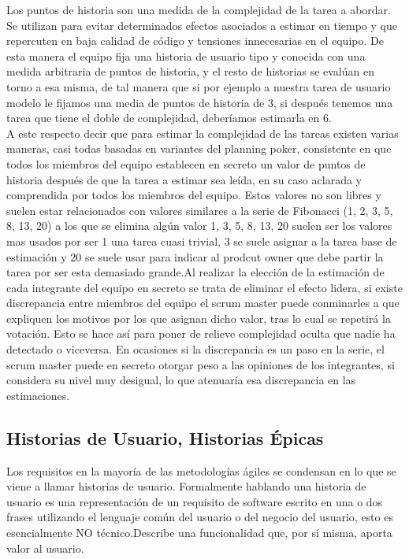 \documentclass[../pfc.tex]{subfiles}
\begin{document}
	Los puntos de historia son una medida de la complejidad de la tarea a abordar. Se utilizan para evitar determinados efectos asociados a estimar en tiempo y que repercuten en baja calidad de código y tensiones innecesarias en el equipo. De esta manera el equipo fija una historia de usuario tipo y conocida con una medida arbitraria de puntos de historia, y el resto de historias se evalúan en torno a esa misma, de tal manera que si por ejemplo a nuestra tarea de usuario modelo le fijamos una media de puntos de historia de 3, si después tenemos una tarea que tiene el doble de complejidad, deberíamos estimarla en 6.\\
	
	A este respecto decir que para estimar la complejidad de las tareas existen varias maneras, casi todas basadas en variantes  del planning poker, consistente en que todos los miembros del equipo establecen en secreto un valor de puntos de historia después de que la tarea a estimar sea leída, en su caso aclarada y comprendida por todos los miembros del equipo. Estos valores no son libres y suelen estar relacionados con valores similares a la serie de Fibonacci (1, 2, 3, 5, 8, 13, 20) a los que se elimina algún valor 1, 3, 5, 8, 13, 20 suelen ser los valores mas usados por ser 1 una tarea cuasi trivial, 3 se suele asignar a la tarea base de estimación y 20 se suele usar para indicar al prodcut owner que debe partir la tarea por ser esta demasiado grande.Al realizar la elección de la estimación de cada integrante del equipo en secreto se trata de eliminar el efecto lidera, si existe discrepancia entre miembros del equipo el scrum master puede conminarles a que expliquen los motivos por los que asignan dicho valor, tras lo cual se repetirá la votación. Esto se hace así para poner de relieve complejidad oculta que nadie ha detectado o viceversa. En ocasiones si la discrepancia es un paso en la serie, el scrum master puede en secreto otorgar peso a las opiniones de los integrantes, si considera su nivel muy desigual, lo que atenuaría esa discrepancia en las estimaciones.
	
	\subsection{Historias de Usuario, Historias Épicas}
	
	Los requisitos en la mayoría de las metodologías ágiles se condensan en lo que se viene a llamar historias de usuario. Formalmente hablando una historia de usuario es una representación de un requisito de software escrito en una o dos frases utilizando el lenguaje común del usuario o del negocio del usuario, esto es esencialmente NO técnico.Describe una funcionalidad que, por sí misma, aporta valor al usuario.\\
	
\end{document}
